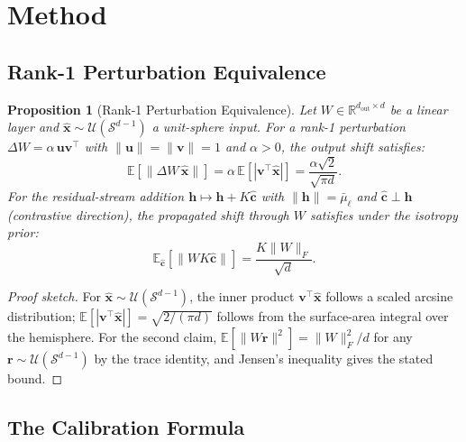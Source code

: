 \documentclass{article}
\newtheorem{proposition}{Proposition}
\newcommand{\hh}{\mathbf{h}}
\newcommand{\uu}{\mathbf{u}}
\newcommand{\vv}{\mathbf{v}}
\newcommand{\xh}{\hat{\mathbf{x}}}
\newcommand{\ch}{\hat{\mathbf{c}}}
\newcommand{\mubar}{\bar{\mu}}
\newcommand{\E}{\mathbb{E}}
\begin{document}
\section{Method}
\label{sec:method}

\subsection{Rank-1 Perturbation Equivalence}

\begin{proposition}[Rank-1 Perturbation Equivalence]
\label{prop:rank1}
Let $W \in \mathbb{R}^{d_{\mathrm{out}} \times d}$ be a linear layer and
$\xh \sim \mathcal{U}(\mathcal{S}^{d-1})$ a unit-sphere input.
For a rank-1 perturbation $\Delta W = \alpha\,\uu\vv^\top$ with
$\|\uu\|{=}\|\vv\|{=}1$ and $\alpha > 0$, the output shift satisfies:
\[
  \E\!\left[\|\Delta W\,\xh\|\right]
  = \alpha\,\E\!\left[|\vv^\top\xh|\right]
  = \frac{\alpha\sqrt{2}}{\sqrt{\pi d}}.
\]
For the residual-stream addition $\hh \mapsto \hh + K\ch$ with
$\|\hh\|{=}\mubar_\ell$ and $\ch \perp \hh$ (contrastive direction),
the propagated shift through $W$ satisfies under the isotropy prior:
\[
  \E_{\ch}\!\left[\|W K\ch\|\right] = \frac{K\|W\|_F}{\sqrt{d}}.
\]
\end{proposition}

\begin{proof}[Proof sketch]
For $\xh \sim \mathcal{U}(\mathcal{S}^{d-1})$, the inner product $\vv^\top\xh$ follows
a scaled arcsine distribution; $\E[|\vv^\top\xh|] = \sqrt{2/(\pi d)}$ follows from the
surface-area integral over the hemisphere.
For the second claim, $\E[\|W\mathbf{r}\|^2] = \|W\|_F^2/d$ for any $\mathbf{r} \sim
\mathcal{U}(\mathcal{S}^{d-1})$ by the trace identity, and Jensen's inequality gives the
stated bound.
\end{proof}

\subsection{The Calibration Formula}
\label{sec:calibration}
\end{document}
